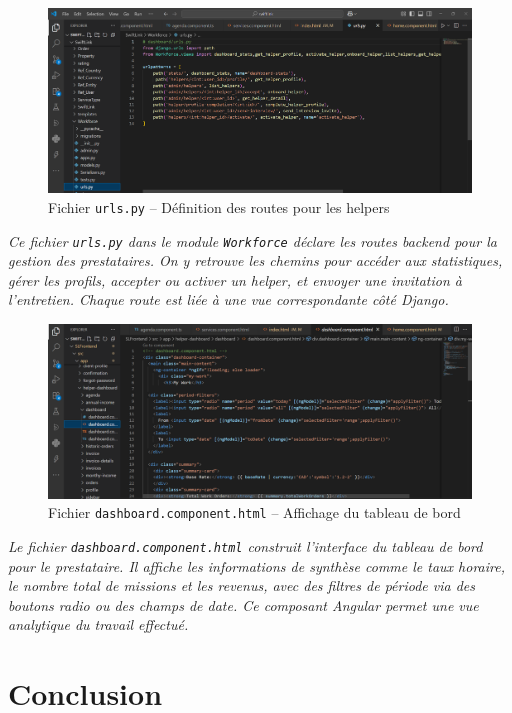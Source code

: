 \begin{figure}[H]
\centering
\includegraphics[width=0.85\linewidth]{figures/helper urls.png}
\caption{Fichier \texttt{urls.py} – Définition des routes pour les helpers}
\end{figure}
\textit{Ce fichier \texttt{urls.py} dans le module \texttt{Workforce} déclare les routes backend pour la gestion des prestataires. On y retrouve les chemins pour accéder aux statistiques, gérer les profils, accepter ou activer un helper, et envoyer une invitation à l’entretien. Chaque route est liée à une vue correspondante côté Django.}

\vspace{0.5cm}

\begin{figure}[H]
\centering
\includegraphics[width=0.85\linewidth]{figures/helper dash.png}
\caption{Fichier \texttt{dashboard.component.html} – Affichage du tableau de bord}
\end{figure}
\textit{Le fichier \texttt{dashboard.component.html} construit l’interface du tableau de bord pour le prestataire. Il affiche les informations de synthèse comme le taux horaire, le nombre total de missions et les revenus, avec des filtres de période via des boutons radio ou des champs de date. Ce composant Angular permet une vue analytique du travail effectué.}

\section*{Conclusion}

